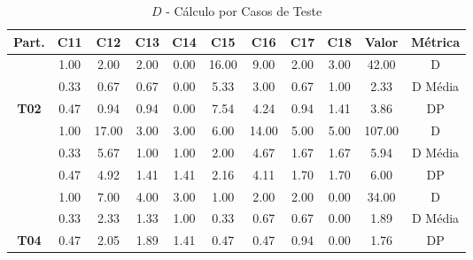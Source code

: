 \begin{table}[htbp]
	\centering
	\caption{$D$ - Cálculo por Casos de Teste}
	\begin{tabular}{|c|c|c|c|c|c|c|c|c|cc}
		\hline
		\rowcolor[HTML]{D9D9D9} 
		\cellcolor[HTML]{D0CECE}\textbf{Part.} & \textbf{C11} & \textbf{C12} & \textbf{C13} & \textbf{C14} & \textbf{C15} & \textbf{C16} & \textbf{C17} & \textbf{C18} & \multicolumn{1}{c|}{\cellcolor[HTML]{D0CECE}\textbf{Valor}} & \multicolumn{1}{c|}{\cellcolor[HTML]{D0CECE}\textbf{Métrica}} \\ \hline
		\cellcolor[HTML]{F2F2F2} & 1.00 & 2.00 & 2.00 & 0.00 & 16.00 & 9.00 & 2.00 & 3.00 & \multicolumn{1}{c|}{42.00} & \multicolumn{1}{c|}{D} \\ \cline{2-11} 
		\rowcolor[HTML]{D9D9D9} 
		\cellcolor[HTML]{F2F2F2} & 0.33 & 0.67 & 0.67 & 0.00 & 5.33 & 3.00 & 0.67 & 1.00 & \multicolumn{1}{c|}{\cellcolor[HTML]{D9D9D9}2.33} & \multicolumn{1}{c|}{\cellcolor[HTML]{D9D9D9}D Média} \\ \cline{2-11} 
		\multirow{-3}{*}{\cellcolor[HTML]{F2F2F2}\textbf{T02}} & 0.47 & 0.94 & 0.94 & 0.00 & 7.54 & 4.24 & 0.94 & 1.41 & \multicolumn{1}{c|}{3.86} & \multicolumn{1}{c|}{DP} \\ \hline
		\rowcolor[HTML]{D9D9D9} 
		\cellcolor[HTML]{F2F2F2} & 1.00 & 17.00 & 3.00 & 3.00 & 6.00 & 14.00 & 5.00 & 5.00 & \multicolumn{1}{c|}{\cellcolor[HTML]{D9D9D9}107.00} & \multicolumn{1}{c|}{\cellcolor[HTML]{D9D9D9}D} \\ \cline{2-11} 
		\cellcolor[HTML]{F2F2F2} & 0.33 & 5.67 & 1.00 & 1.00 & 2.00 & 4.67 & 1.67 & 1.67 & \multicolumn{1}{c|}{5.94} & \multicolumn{1}{c|}{D Média} \\ \cline{2-11} 
		\rowcolor[HTML]{D9D9D9} 
		\multirow{-3}{*}{\cellcolor[HTML]{F2F2F2}\textbf{T03}} & 0.47 & 4.92 & 1.41 & 1.41 & 2.16 & 4.11 & 1.70 & 1.70 & \multicolumn{1}{c|}{\cellcolor[HTML]{D9D9D9}6.00} & \multicolumn{1}{c|}{\cellcolor[HTML]{D9D9D9}DP} \\ \hline
		\cellcolor[HTML]{F2F2F2} & 1.00 & 7.00 & 4.00 & 3.00 & 1.00 & 2.00 & 2.00 & 0.00 & \multicolumn{1}{c|}{34.00} & \multicolumn{1}{c|}{D} \\ \cline{2-11} 
		\rowcolor[HTML]{D9D9D9} 
		\cellcolor[HTML]{F2F2F2} & 0.33 & 2.33 & 1.33 & 1.00 & 0.33 & 0.67 & 0.67 & 0.00 & \multicolumn{1}{c|}{\cellcolor[HTML]{D9D9D9}1.89} & \multicolumn{1}{c|}{\cellcolor[HTML]{D9D9D9}D Média} \\ \cline{2-11} 
		\multirow{-3}{*}{\cellcolor[HTML]{F2F2F2}\textbf{T04}} & 0.47 & 2.05 & 1.89 & 1.41 & 0.47 & 0.47 & 0.94 & 0.00 & \multicolumn{1}{c|}{1.76} & \multicolumn{1}{c|}{DP} \\ \hline

\end{tabular}
\end{table}
